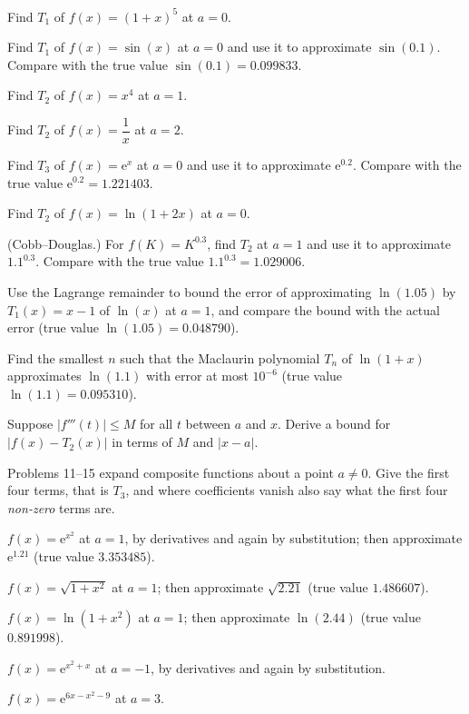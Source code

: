 \begin{problems}
  \item Find $T_{1}$ of $f(x)=(1+x)^{5}$ at $a=0$.
  \item Find $T_{1}$ of $f(x)=\sin(x)$ at $a=0$ and use it to
        approximate $\sin(0.1)$. Compare with the true value
        $\sin(0.1)=0.099833$.
  \item Find $T_{2}$ of $f(x)=x^{4}$ at $a=1$.
  \item Find $T_{2}$ of $f(x)=\dfrac{1}{x}$ at $a=2$.
  \item Find $T_{3}$ of $f(x)=\mathrm{e}^{x}$ at $a=0$ and use it to
        approximate $\mathrm{e}^{0.2}$. Compare with the true value
        $\mathrm{e}^{0.2}=1.221403$.
  \item Find $T_{2}$ of $f(x)=\ln(1+2x)$ at $a=0$.
  \item (Cobb--Douglas.) For $f(K)=K^{0.3}$, find $T_{2}$ at $a=1$ and
        use it to approximate $1.1^{0.3}$. Compare with the true value
        $1.1^{0.3}=1.029006$.
  \item Use the Lagrange remainder to bound the error of approximating
        $\ln(1.05)$ by $T_{1}(x)=x-1$ of $\ln(x)$ at $a=1$, and compare
        the bound with the actual error (true value
        $\ln(1.05)=0.048790$).
  \item Find the smallest $n$ such that the Maclaurin polynomial
        $T_{n}$ of $\ln(1+x)$ approximates $\ln(1.1)$ with error at
        most $10^{-6}$ (true value $\ln(1.1)=0.095310$).
  \item Suppose $|f'''(t)|\leq M$ for all $t$ between $a$ and $x$.
        Derive a bound for $|f(x)-T_{2}(x)|$ in terms of $M$ and
        $|x-a|$.
\end{problems}

Problems 11--15 expand composite functions about a point $a\neq0$. Give the
first four terms, that is $T_{3}$, and where coefficients vanish also say
what the first four \emph{non-zero} terms are.

\begin{problems}[resume]
  \item $f(x)=\mathrm{e}^{x^{2}}$ at $a=1$, by derivatives and again by
        substitution; then approximate $\mathrm{e}^{1.21}$ (true value
        $3.353485$).
  \item $f(x)=\sqrt{1+x^{2}}$ at $a=1$; then approximate $\sqrt{2.21}$
        (true value $1.486607$).
  \item $f(x)=\ln(1+x^{2})$ at $a=1$; then approximate $\ln(2.44)$ (true
        value $0.891998$).
  \item $f(x)=\mathrm{e}^{x^{2}+x}$ at $a=-1$, by derivatives and again by
        substitution.
  \item $f(x)=\mathrm{e}^{6x-x^{2}-9}$ at $a=3$.
\end{problems}

